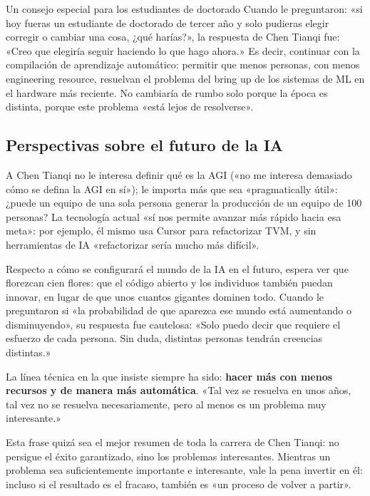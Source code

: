 \documentclass[a4paper]{article}
\begin{document}
\begin{knowledgebox}{Un consejo especial para los estudiantes de doctorado}
Cuando le preguntaron: «si hoy fueras un estudiante de doctorado de tercer año y solo pudieras elegir corregir o cambiar una cosa, ¿qué harías?», la respuesta de Chen Tianqi fue: «Creo que elegiría seguir haciendo lo que hago ahora.» Es decir, continuar con la compilación de aprendizaje automático: permitir que menos personas, con menos engineering resource, resuelvan el problema del bring up de los sistemas de ML en el hardware más reciente. No cambiaría de rumbo solo porque la época es distinta, porque este problema «está lejos de resolverse».
\end{knowledgebox}

\subsection{Perspectivas sobre el futuro de la IA}

A Chen Tianqi no le interesa definir qué es la AGI («no me interesa demasiado cómo se defina la AGI en sí»); le importa más que sea «pragmatically útil»: ¿puede un equipo de una sola persona generar la producción de un equipo de 100 personas? La tecnología actual «sí nos permite avanzar más rápido hacia esa meta»: por ejemplo, él mismo usa Cursor para refactorizar TVM, y sin herramientas de IA «refactorizar sería mucho más difícil».

Respecto a cómo se configurará el mundo de la IA en el futuro, espera ver que florezcan cien flores: que el código abierto y los individuos también puedan innovar, en lugar de que unos cuantos gigantes dominen todo. Cuando le preguntaron si «la probabilidad de que aparezca ese mundo está aumentando o disminuyendo», su respuesta fue cautelosa: «Solo puedo decir que requiere el esfuerzo de cada persona. Sin duda, distintas personas tendrán creencias distintas.»

La línea técnica en la que insiste siempre ha sido: \textbf{hacer más con menos recursos y de manera más automática}. «Tal vez se resuelva en unos años, tal vez no se resuelva necesariamente, pero al menos es un problema muy interesante.»

Esta frase quizá sea el mejor resumen de toda la carrera de Chen Tianqi: no persigue el éxito garantizado, sino los problemas interesantes. Mientras un problema sea suficientemente importante e interesante, vale la pena invertir en él: incluso si el resultado es el fracaso, también es «un proceso de volver a partir».
\end{document}
